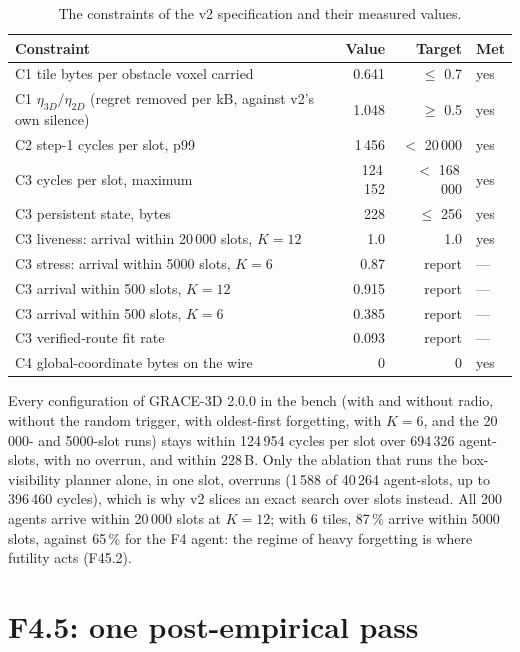 \documentclass[11pt,a4paper]{article}
\begin{document}
\begin{table}[htbp]\centering\small
\begin{tabularx}{\linewidth}{Lrrl}
\toprule
Constraint & Value & Target & Met \\
\midrule
C1 tile bytes per obstacle voxel carried & 0.641 & $\le$ 0.7 & yes \\
C1 $\eta_{3D}/\eta_{2D}$ (regret removed per kB, against v2's own silence) & 1.048 & $\ge$ 0.5 & yes \\
C2 step-1 cycles per slot, p99 & 1\,456 & $<$ 20\,000 & yes \\
C3 cycles per slot, maximum & 124\,152 & $<$ 168\,000 & yes \\
C3 persistent state, bytes & 228 & $\le$ 256 & yes \\
C3 liveness: arrival within 20\,000 slots, $K=12$ & 1.0 & 1.0 & yes \\
C3 stress: arrival within 5000 slots, $K=6$ & 0.87 & report & --- \\
C3 arrival within 500 slots, $K=12$ & 0.915 & report & --- \\
C3 arrival within 500 slots, $K=6$ & 0.385 & report & --- \\
C3 verified-route fit rate & 0.093 & report & --- \\
C4 global-coordinate bytes on the wire & 0 & 0 & yes \\
\bottomrule
\end{tabularx}
\caption{The constraints of the v2 specification and their measured values.}
\label{tab:constraints}
\end{table}

Every configuration of GRACE-3D 2.0.0 in the bench (with and without radio, without the random trigger, with
oldest-first forgetting, with $K=6$, and the 20\,000- and 5000-slot runs) stays within 124\,954 cycles per slot over
694\,326 agent-slots, with no overrun, and within 228\,B. Only the ablation that runs the box-visibility planner alone,
in one slot, overruns (1\,588 of 40\,264 agent-slots, up to 396\,460 cycles), which is why v2 slices an exact search
over slots instead. All 200 agents arrive within 20\,000 slots at $K=12$; with 6 tiles, 87\,\% arrive within 5000
slots, against 65\,\% for the F4 agent: the regime of heavy forgetting is where futility acts (F45.2).

\section{F4.5: one post-empirical pass}\label{sec:f45}
\end{document}
